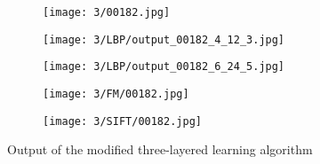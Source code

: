 \documentclass[draft,final]{vutinfth} %
\begin{document}
\begin{figure}[h]
  \centering
  \begin{subfigure}[b]{0.19\columnwidth}
    \centering
    \texttt{[image: 3/00182.jpg]}
    \label{fig:pe:182:orig}
  \end{subfigure}
  \begin{subfigure}[b]{0.19\columnwidth}
    \centering
    \texttt{[image: 3/LBP/output\_00182\_4\_12\_3.jpg]}
    \label{fig:pe:182:LBPs}
  \end{subfigure}
  \begin{subfigure}[b]{0.19\columnwidth}
    \centering
    \texttt{[image: 3/LBP/output\_00182\_6\_24\_5.jpg]}
    \label{fig:pe:182:LBPb}
  \end{subfigure}
  \begin{subfigure}[b]{0.19\columnwidth}
    \centering
    \texttt{[image: 3/FM/00182.jpg]}
    \label{fig:pe:182:FM}
  \end{subfigure}
  \begin{subfigure}[b]{0.19\columnwidth}
    \centering
    \texttt{[image: 3/SIFT/00182.jpg]}
    \label{fig:pe:182:SIFT}
  \end{subfigure}
  \caption{Output of the modified three-layered learning algorithm}
  \label{fig:pe:182}
\end{figure}
\end{document}
